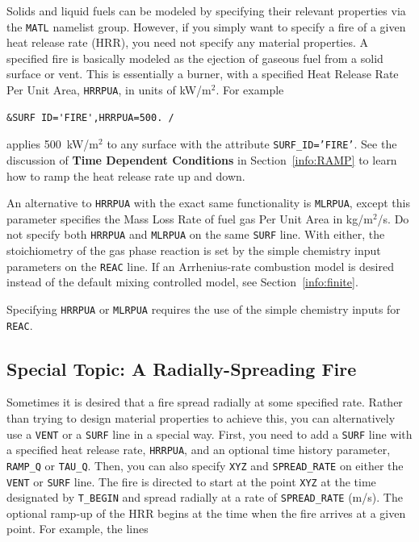 \documentclass[11pt]{book}
\newcommand{\ct}{\tt\small}
\begin{document}
\label{info:gas_burner}

Solids and liquid fuels can be modeled by specifying their relevant
properties via the {\ct MATL} namelist group. However, if you simply
want to specify a fire of a given heat release rate (HRR),
you need not specify any material properties. A specified fire is
basically modeled as the ejection of gaseous fuel
from a solid surface or vent. This is essentially a burner, with a
specified Heat Release Rate Per Unit Area, {\ct HRRPUA}, in units of
kW/m$^2$. For example

\footnotesize
\begin{verbatim}
&SURF ID='FIRE',HRRPUA=500. /
\end{verbatim}
\normalsize

\noindent
applies 500~kW/m$^2$ to any surface with the attribute
{\ct SURF\_ID='FIRE'}. See the discussion of {\bf Time Dependent Conditions}
in Section~\ref{info:RAMP} to learn how to ramp the heat release rate up and down.

An alternative to {\ct HRRPUA} with the exact same functionality is
{\ct MLRPUA}, except this parameter
specifies the Mass Loss Rate of fuel gas Per Unit Area in kg/m$^2$/s. Do not specify both
{\ct HRRPUA} and {\ct MLRPUA} on the same {\ct SURF} line. With either,
the stoichiometry of the gas phase reaction is set by the simple chemistry input
parameters on the {\ct REAC} line.
If an Arrhenius-rate combustion model is desired instead of the default mixing controlled model, see Section~\ref{info:finite}.

\begin{warning}
Specifying {\ct HRRPUA} or {\ct MLRPUA} requires the use of the simple chemistry inputs for {\ct REAC}.
\end{warning}



\subsection{Special Topic: A Radially-Spreading Fire}
\label{info:spread}

Sometimes it is desired that a fire spread radially at some specified
rate. Rather than trying to design material properties
to achieve this, you can alternatively use a {\ct VENT} or a {\ct SURF} line in a special way.
First, you need to add a {\ct SURF} line with
a specified heat release rate, {\ct HRRPUA}, and an optional
time history parameter, {\ct RAMP\_Q} or {\ct TAU\_Q}. Then, you can also specify {\ct XYZ} and {\ct SPREAD\_RATE} on either the {\ct VENT} or {\ct SURF} line.
The fire is directed to start at the point {\ct XYZ} at the time designated by {\ct T\_BEGIN} and spread
radially at a rate of {\ct SPREAD\_RATE} (m/s). The optional ramp-up of the HRR begins at
the time when the fire arrives at a given point.
For example, the lines
\end{document}
